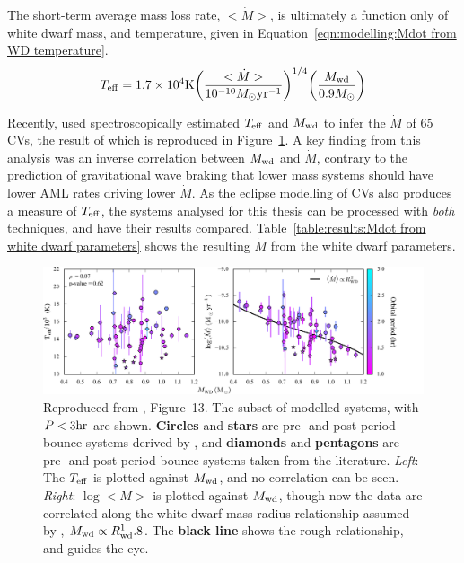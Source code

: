 The short-term average mass loss rate, $<\dot M>$, is ultimately a function only of white dwarf mass, and temperature, given in Equation~\ref{eqn:modelling:Mdot from WD temperature}.
\begin{equation}
    \label{eqn:modelling:Mdot from WD temperature}
    T_{\rm eff} = 1.7 \times 10^4 {\rm K} \bigg( \frac{<\dot M>}{10^{-10} M_\odot {\rm yr}^{-1}} \bigg)^{1/4} \bigg( \frac{M_{\rm wd}}{0.9 M_\odot} \bigg)
\end{equation}

Recently, \citet{Pala2021} used spectroscopically estimated $T_{\rm eff}$ and $M_{\rm wd}$ to infer the $\dot M$ of 65 CVs, the result of which is reproduced in Figure~\ref{fig:modelling:pala2022 fig13}.
A key finding from this analysis was an inverse correlation between $M_{\rm wd}$ and $\dot M$, contrary to the prediction of gravitational wave braking that lower mass systems should have lower AML rates driving lower $\dot M$.
As the eclipse modelling of CVs also produces a measure of $T_{\rm eff}$, the systems analysed for this thesis can be processed with {\it both} techniques, and have their results compared. Table~\ref{table:results:Mdot from white dwarf parameters} shows the resulting $\dot M$ from the white dwarf parameters.
\begin{figure}
    \centering
    \includegraphics[width=\textwidth]{figures/modelling/pala_2022_fig13.png}
    \caption{Reproduced from \citet{Pala2021}, Figure~13. The subset of modelled systems, with $P < 3{\rm hr}$ are shown. {\bf Circles} and {\bf stars} are pre- and post-period bounce systems derived by \citet{Pala2021}, and {\bf diamonds} and {\bf pentagons} are pre- and post-period bounce systems taken from the literature. {\it Left}: The $T_{\rm eff}$ is plotted against $M_{\rm wd}$, and no correlation can be seen. {\it Right}: $\log<\dot M>$ is plotted against $M_{\rm wd}$, though now the data are correlated along the white dwarf mass-radius relationship assumed by \citet{Pala2021}, $M_{\rm wd} \propto R_{\rm wd}^1.8$. The {\bf black line} shows the rough relationship, and guides the eye.}
    \label{fig:modelling:pala2022 fig13}
\end{figure}


